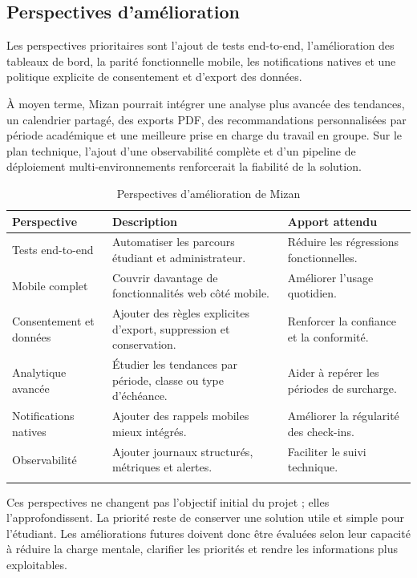 \documentclass{rapportENSET}
\begin{document}
\subsection*{Perspectives d'amélioration}
Les perspectives prioritaires sont l'ajout de tests end-to-end, l'amélioration des tableaux de bord, la parité fonctionnelle mobile, les notifications natives et une politique explicite de consentement et d'export des données.

À moyen terme, Mizan pourrait intégrer une analyse plus avancée des tendances, un calendrier partagé, des exports PDF, des recommandations personnalisées par période académique et une meilleure prise en charge du travail en groupe. Sur le plan technique, l'ajout d'une observabilité complète et d'un pipeline de déploiement multi-environnements renforcerait la fiabilité de la solution.

\begin{longtable}{@{}L{0.28\textwidth}L{0.36\textwidth}L{0.26\textwidth}@{}}
\toprule
\textbf{Perspective} & \textbf{Description} & \textbf{Apport attendu} \\
\midrule
\endhead
Tests end-to-end & Automatiser les parcours étudiant et administrateur. & Réduire les régressions fonctionnelles. \\
Mobile complet & Couvrir davantage de fonctionnalités web côté mobile. & Améliorer l'usage quotidien. \\
Consentement et données & Ajouter des règles explicites d'export, suppression et conservation. & Renforcer la confiance et la conformité. \\
Analytique avancée & Étudier les tendances par période, classe ou type d'échéance. & Aider à repérer les périodes de surcharge. \\
Notifications natives & Ajouter des rappels mobiles mieux intégrés. & Améliorer la régularité des check-ins. \\
Observabilité & Ajouter journaux structurés, métriques et alertes. & Faciliter le suivi technique. \\
\bottomrule
\caption{Perspectives d'amélioration de Mizan}
\end{longtable}

Ces perspectives ne changent pas l'objectif initial du projet ; elles l'approfondissent. La priorité reste de conserver une solution utile et simple pour l'étudiant. Les améliorations futures doivent donc être évaluées selon leur capacité à réduire la charge mentale, clarifier les priorités et rendre les informations plus exploitables.
\end{document}

